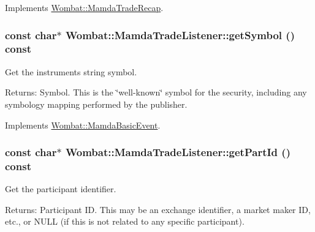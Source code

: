 Implements \hyperlink{classWombat_1_1MamdaTradeRecap_43b14f3da3e3df82401ac524cb33f6a5}{Wombat::Mamda\-Trade\-Recap}.\hypertarget{classWombat_1_1MamdaTradeListener_6a4f381f676df4731509adcce8287331}{
\subsubsection[getSymbol]{\setlength{\rightskip}{0pt plus 5cm}const char$\ast$ Wombat::Mamda\-Trade\-Listener::get\-Symbol () const}}
\label{classWombat_1_1MamdaTradeListener_6a4f381f676df4731509adcce8287331}


Get the instruments string symbol. 

\begin{Desc}
\item[Returns:]Symbol. This is the \char`\"{}well-known\char`\"{} symbol for the security, including any symbology mapping performed by the publisher. \end{Desc}


Implements \hyperlink{classWombat_1_1MamdaBasicEvent_8783b136a1305d21c578ced8618c090b}{Wombat::Mamda\-Basic\-Event}.\hypertarget{classWombat_1_1MamdaTradeListener_9fc3574e811a832c3b7244ebf3dd849d}{
\subsubsection[getPartId]{\setlength{\rightskip}{0pt plus 5cm}const char$\ast$ Wombat::Mamda\-Trade\-Listener::get\-Part\-Id () const}}
\label{classWombat_1_1MamdaTradeListener_9fc3574e811a832c3b7244ebf3dd849d}


Get the participant identifier. 

\begin{Desc}
\item[Returns:]Participant ID. This may be an exchange identifier, a market maker ID, etc., or NULL (if this is not related to any specific participant). \end{Desc}



